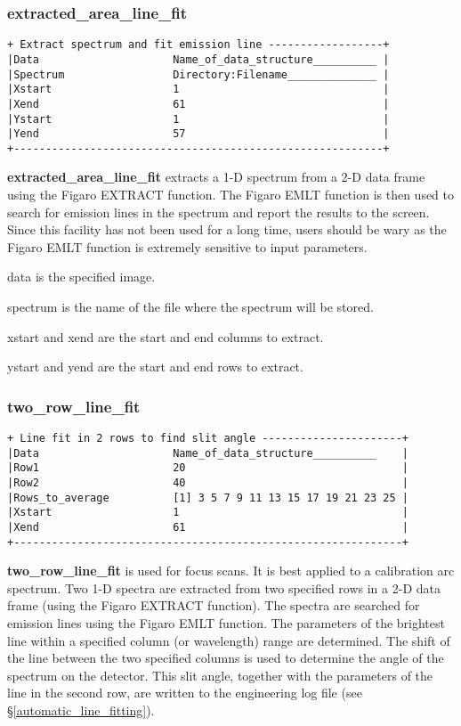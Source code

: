 {\subsubsection{extracted\_area\_line\_fit}
\begin{verbatim}
+ Extract spectrum and fit emission line ------------------+
|Data                     Name_of_data_structure__________ |
|Spectrum                 Directory:Filename______________ |
|Xstart                   1                                |
|Xend                     61                               |
|Ystart                   1                                |
|Yend                     57                               |
+----------------------------------------------------------+
\end{verbatim}

{\bf extracted\_area\_line\_fit} extracts a 1-D spectrum from
a 2-D data frame using the Figaro EXTRACT function.
The Figaro EMLT function is then used to search for emission lines
in the spectrum and report the results to the screen. Since this
facility has not been used for a long time, users should be wary
as the Figaro EMLT function is extremely sensitive to input parameters.

{\sf data} is the specified image.

{\sf spectrum} is the name of the file where the spectrum will be stored.

{\sf xstart} and {\sf xend} are the start and end columns to extract.

{\sf ystart} and {\sf yend} are the start and end rows to extract.

\subsubsection{two\_row\_line\_fit}
\begin{verbatim}
+ Line fit in 2 rows to find slit angle ----------------------+
|Data                     Name_of_data_structure__________    |
|Row1                     20                                  |
|Row2                     40                                  |
|Rows_to_average          [1] 3 5 7 9 11 13 15 17 19 21 23 25 |
|Xstart                   1                                   |
|Xend                     61                                  |
+-------------------------------------------------------------+
\end{verbatim}

{\bf two\_row\_line\_fit} is used for focus scans.
It is best applied to a calibration arc spectrum.
Two 1-D spectra are extracted from two specified rows in a 2-D data
frame (using the Figaro EXTRACT function). 
The spectra are searched for emission lines using the Figaro EMLT
function. 
The parameters of the brightest line within a specified column (or 
wavelength) range are determined. The shift of the line between the two 
specified columns is used to determine the angle of the spectrum on the 
detector.
This slit angle, together with the parameters of the line in the second 
row, are written to the engineering log file (see \S \ref{automatic_line_fitting}).

}
